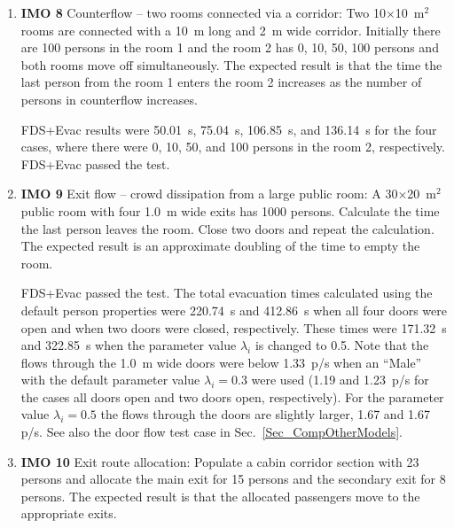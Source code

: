 \documentclass[12pt,a4paper,final,twoside]{stylevk}
\begin{document}
%
\begin{enumerate}
%
\item \textbf{IMO 8} Counterflow -- two rooms connected via a
  corridor: Two 10$\times$10~$\mathrm{m^2}$ rooms are connected with a
  10~m long and 2~m wide corridor.  Initially there are 100 persons in
  the room 1 and the room 2 has 0, 10, 50, 100 persons and both rooms
  move off simultaneously.  The expected result is that the time the
  last person from the room 1 enters the room 2 increases as the
  number of persons in counterflow increases.
  
  FDS+Evac results were 50.01~s, 75.04~s, 106.85~s, and 136.14~s for
  the four cases, where there were 0, 10, 50, and 100 persons in the
  room 2, respectively.  FDS+Evac passed the test.
%
\item \textbf{IMO 9} Exit flow -- crowd dissipation from a large
  public room: A 30$\times$20~$\mathrm{m^2}$ public room with four
  1.0~m wide exits has 1000 persons.  Calculate the time the last
  person leaves the room.  Close two doors and repeat the calculation.
  The expected result is an approximate doubling of the time to empty
  the room.
  
  FDS+Evac passed the test.  The total evacuation times calculated
  using the default person properties were 220.74~s and 412.86~s when
  all four doors were open and when two doors were closed,
  respectively.  These times were 171.32~s and 322.85~s when the
  parameter value $\lambda_i$ is changed to 0.5.  Note that the flows
  through the 1.0~m wide doors were below 1.33~p/s when an ``Male''
  with the default parameter value $\lambda_i = 0.3$ were used (1.19
  and 1.23~p/s for the cases all doors open and two doors open,
  respectively).  For the parameter value $\lambda_i = 0.5$ the flows
  through the doors are slightly larger, 1.67 and 1.67 p/s.  See also
  the door flow test case in Sec.~\ref{Sec_CompOtherModels}.
%
\item \textbf{IMO 10} Exit route allocation: Populate a cabin corridor
  section with 23 persons and allocate the main exit for 15 persons
  and the secondary exit for 8 persons.  The expected result is that
  the allocated passengers move to the appropriate exits.
  

\end{enumerate}
\end{document}
